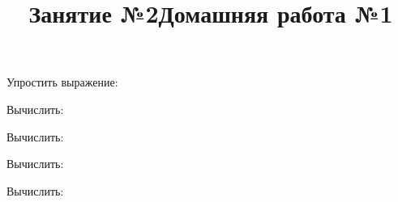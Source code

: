 \newpage
\title{Занятие №2}
\begin{listofex}
	\item {}
	\item Упростить выражение:
	\begin{enumcols}[itemcolumns=2]
		\item {}
		\item {}
	\end{enumcols}
	\item Вычислить:
	\begin{enumcols}[itemcolumns=3]
		\item {}
		\item {}
		\item {}
		\item {}
		\item {}
	\end{enumcols}
	\item Вычислить:
	\begin{enumcols}[itemcolumns=2]
		\item {}
		\item {}
		\item {}
		\item {}
		\item {}
	\end{enumcols}
	\item Вычислить:
	\begin{enumcols}[itemcolumns=2]
		\item {}
		\item {}
	\end{enumcols}
	\item Вычислить:
	\begin{enumcols}[itemcolumns=3]
		\item {}
		\item {}
		\item {}
	\end{enumcols}
\end{listofex}
\newpage
\title{Домашняя работа №1}
